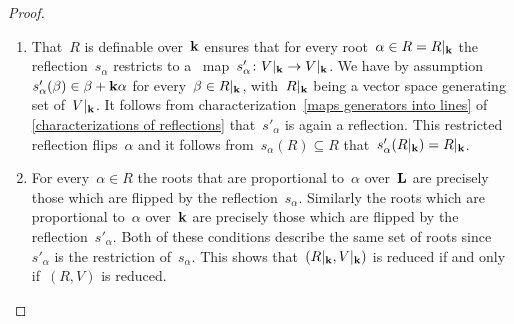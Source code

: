 \begin{proof}
  \leavevmode
  \begin{enumerate}
    \item
      That~$R$ is definable over~$\kf$ ensures that for every root~$\alpha \in R = \restrict{R}{\kf}$ the reflection~$s_\alpha$ restricts to a~{\linear{$\kf$}} map~$s'_\alpha \colon \restrict{V}{\kf} \to \restrict{V}{\kf}$.
      We have by assumption~$s'_\alpha(\beta) \in \beta + \mathbf{k} \alpha$ for every~$\beta \in \restrict{R}{\kf}$, with~$\restrict{R}{\kf}$ being a vector space generating set of~$\restrict{V}{\kf}$.
      It follows from characterization~\ref*{maps generators into lines} of \cref{characterizations of reflections} that~$s'_\alpha$ is again a reflection.
      This restricted reflection flips~$\alpha$ and it follows from~$s_\alpha(R) \subseteq R$ that~$s'_\alpha(\restrict{R}{\kf}) = \restrict{R}{\kf}$.
    \item
      For every~$\alpha \in R$ the roots that are proportional to~$\alpha$ over~$\mathbf{L}$ are precisely those which are flipped by the reflection~$s_\alpha$.
      Similarly the roots which are proportional to~$\alpha$ over~$\kf$ are precisely those which are flipped by the reflection~$s'_\alpha$.
      Both of these conditions describe the same set of roots since~$s'_\alpha$ is the restriction of~$s_\alpha$.
      This shows that~$(\restrict{R}{\kf}, \restrict{V}{\kf})$ is reduced if and only if~$(R, V)$ is reduced.
      

\end{enumerate}
\end{proof}
